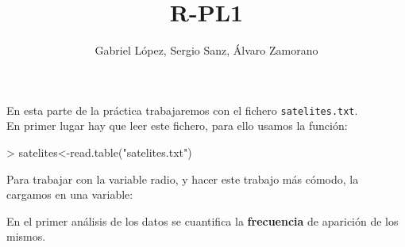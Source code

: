 \documentclass [a4paper] {article}
\title{R-PL1}
\author{Gabriel L\'opez, Sergio Sanz, \'Alvaro Zamorano}
\begin{document}
\maketitle

En esta parte de la pr\'actica trabajaremos con el fichero
\texttt{satelites.txt}.\\

\bigskip
En primer lugar hay que leer este fichero, para ello usamos
la funci\'on:
\begin{Schunk}
\begin{Sinput}
> satelites<-read.table("satelites.txt")
\end{Sinput}
\end{Schunk}

\bigskip
Para trabajar con la variable radio, y hacer este trabajo m\'as
c\'omodo, la cargamos en una variable:
\begin{Schunk}
\end{Schunk}

\bigskip
En el primer an\'alisis de los datos se cuantifica la \textbf{frecuencia}
de aparici\'on de los mismos. 


\graphicspath{ {C:/Users/tromp/Documents/1.Curso_2019-20/1.Cuatrimetestre/2.Ciencia_Datos/LAB/CienciaDatos/Practica1/} }
\end{document}
